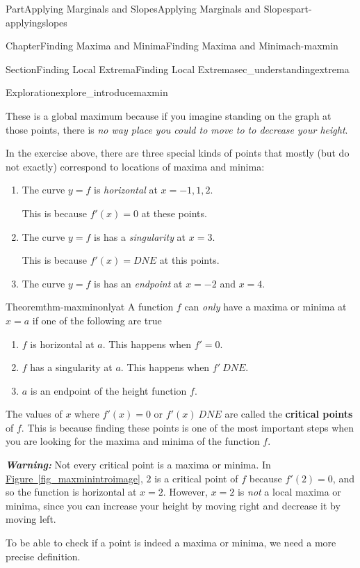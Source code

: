 \documentclass{tufte-book}
\newcommand{\xreffont}{\relax}
\newcommand{\alert}[1]{\textbf{\textit{#1}}}
\newcommand{\terminology}[1]{\textbf{#1}}
\numberwithin{equation}{chapter}
\begin{document}
\begin{partptx}{Part}{Applying Marginals and Slopes}{}{Applying Marginals and Slopes}{}{}{part-applyingslopes}
\begin{chapterptx}{Chapter}{Finding Maxima and Minima}{}{Finding Maxima and Minima}{}{}{ch-maxmin}
\begin{sectionptx}{Section}{Finding Local Extrema}{}{Finding Local Extrema}{}{}{sec_understandingextrema}
\begin{exploration}{Exploration}{}{explore_introducemaxmin}
\begin{enumerate}[font=\bfseries,label=(\alph*),ref=\alph*]
\par
These is a global maximum because if you imagine standing on the graph at those points, there is \emph{no way place you could to move to to decrease your height}.%
\end{enumerate}%
\end{exploration}%
In the exercise above, there are three special kinds of points that mostly (but do not exactly) correspond to locations of maxima and minima:%
\begin{enumerate}
\item{}The curve \(y=f\) is \emph{horizontal} at \(x=-1,1,2\).%
\par
This is because \(f'(x)=0\) at these points.%
\item{}The curve \(y=f\) is has a \emph{singularity} at \(x=3\).%
\par
This is because \(f'(x)=DNE\) at this points.%
\item{}The curve \(y=f\) is has an \emph{endpoint} at \(x=-2\) and \(x=4\).%
\end{enumerate}
%
\begin{theorem}{Theorem}{}{}{thm-maxminonlyat}%
A function \(f\) can \emph{only} have a maxima or minima at \(x=a\) if one of the following are true%
\begin{enumerate}
\item{}\(f\) is horizontal at \(a\).  This happens when \(f'=0\).%
\item{}\(f\) has a singularity at \(a\).  This happens when \(f'\ DNE\).%
\item{}\(a\) is an endpoint of the height function \(f\).%
\end{enumerate}
%
\end{theorem}
The values of \(x\) where \(f'(x)=0\) or \(f'(x)\ DNE\) are called the \terminology{critical points} of \(f\). This is because finding these points is one of the most important steps when you are looking for the maxima and minima of the function \(f\).%
\par
\alert{Warning:} Not every critical point is a maxima or minima. In \hyperref[fig_maxminintroimage]{Figure~{\xreffont\ref{fig_maxminintroimage}}}, \(2\) is a critical point of \(f\) because \(f'(2)=0\), and so the function is horizontal at \(x=2\).  However, \(x=2\) is \emph{not} a local maxima or minima, since you can increase your height by moving right and decrease it by moving left.%
\par
To be able to check if a point is indeed a maxima or minima, we need a more precise definition.%

\end{sectionptx}
\end{chapterptx}
\end{partptx}
\end{document}
